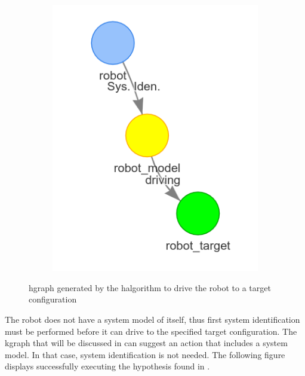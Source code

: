 \begin{figure}[H]
\begin{subfigure}{.3\textwidth}
    \end{subfigure}
    \begin{subfigure}{.3\textwidth}
    \centering
    \includegraphics[width=\textwidth]{figures/proposed_method/connecting_nodes/robot_to_target/robot_iden_drive_target}
    \end{subfigure}
    \caption{\ac{hgraph} generated by the \ac{halgorithm} to drive the robot to a target configuration}%
    \label{fig:robot_drive_hgraph}
\end{figure}

The robot does not have a system model of itself, thus first system identification must be performed before it can drive to the specified target configuration. The \ac{kgraph} that will be discussed in  can suggest an action that includes a system model. In that case, system identification is not needed. The following figure displays successfully executing the hypothesis found in .\bs

